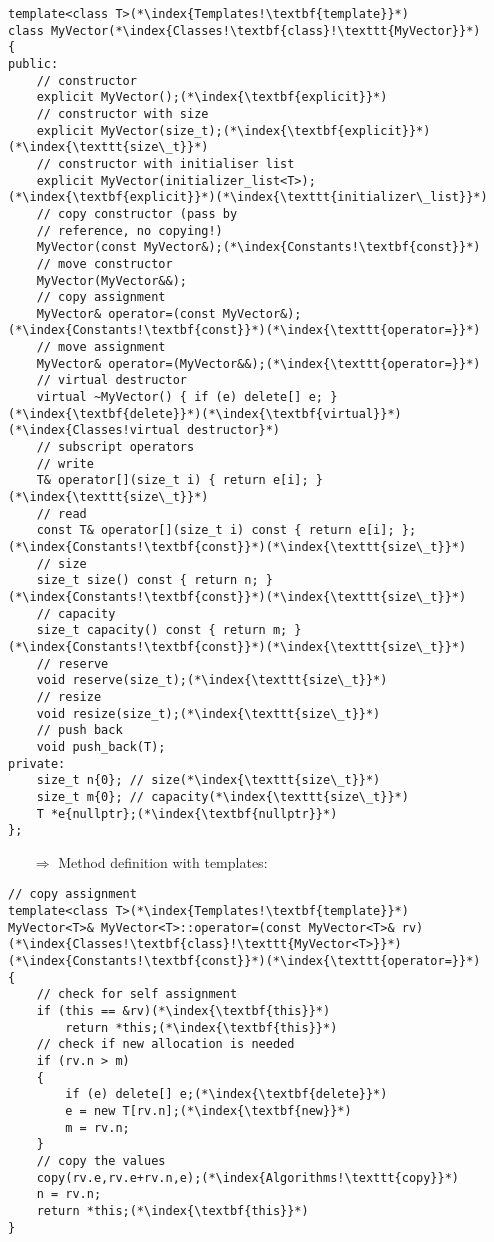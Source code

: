 \documentclass[10pt]{article}
\begin{document}
\begin{lstlisting}
template<class T>(*\index{Templates!\textbf{template}}*)
class MyVector(*\index{Classes!\textbf{class}!\texttt{MyVector}}*)
{
public:
    // constructor
    explicit MyVector();(*\index{\textbf{explicit}}*)
    // constructor with size
    explicit MyVector(size_t);(*\index{\textbf{explicit}}*)(*\index{\texttt{size\_t}}*)
    // constructor with initialiser list
    explicit MyVector(initializer_list<T>);(*\index{\textbf{explicit}}*)(*\index{\texttt{initializer\_list}}*)
    // copy constructor (pass by
    // reference, no copying!)
    MyVector(const MyVector&);(*\index{Constants!\textbf{const}}*)
    // move constructor
    MyVector(MyVector&&);
    // copy assignment
    MyVector& operator=(const MyVector&);(*\index{Constants!\textbf{const}}*)(*\index{\texttt{operator=}}*)
    // move assignment
    MyVector& operator=(MyVector&&);(*\index{\texttt{operator=}}*)
    // virtual destructor
    virtual ~MyVector() { if (e) delete[] e; }(*\index{\textbf{delete}}*)(*\index{\textbf{virtual}}*)(*\index{Classes!virtual destructor}*)
    // subscript operators
    // write
    T& operator[](size_t i) { return e[i]; }(*\index{\texttt{size\_t}}*)
    // read
    const T& operator[](size_t i) const { return e[i]; };(*\index{Constants!\textbf{const}}*)(*\index{\texttt{size\_t}}*)
    // size
    size_t size() const { return n; }(*\index{Constants!\textbf{const}}*)(*\index{\texttt{size\_t}}*)
    // capacity
    size_t capacity() const { return m; }(*\index{Constants!\textbf{const}}*)(*\index{\texttt{size\_t}}*)
    // reserve
    void reserve(size_t);(*\index{\texttt{size\_t}}*)
    // resize
    void resize(size_t);(*\index{\texttt{size\_t}}*)
    // push back
    void push_back(T);
private:
    size_t n{0}; // size(*\index{\texttt{size\_t}}*)
    size_t m{0}; // capacity(*\index{\texttt{size\_t}}*)
    T *e{nullptr};(*\index{\textbf{nullptr}}*)
};
\end{lstlisting}
\begin{enumerate}
\item[$\Rightarrow$] Method definition with templates:
\end{enumerate}
\begin{lstlisting}
// copy assignment
template<class T>(*\index{Templates!\textbf{template}}*)
MyVector<T>& MyVector<T>::operator=(const MyVector<T>& rv)(*\index{Classes!\textbf{class}!\texttt{MyVector<T>}}*)(*\index{Constants!\textbf{const}}*)(*\index{\texttt{operator=}}*)
{
    // check for self assignment
    if (this == &rv)(*\index{\textbf{this}}*)
        return *this;(*\index{\textbf{this}}*)
    // check if new allocation is needed
    if (rv.n > m)
    {
        if (e) delete[] e;(*\index{\textbf{delete}}*)
        e = new T[rv.n];(*\index{\textbf{new}}*)
        m = rv.n;
    }
    // copy the values
    copy(rv.e,rv.e+rv.n,e);(*\index{Algorithms!\texttt{copy}}*)
    n = rv.n;
    return *this;(*\index{\textbf{this}}*)
}
\end{lstlisting}
\end{document}
